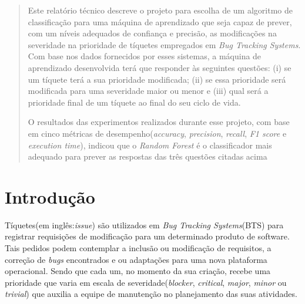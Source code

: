 \documentclass[11pt,twoside]{article}
\begin{document}
\begin{abstract} 

Este relatório técnico descreve o projeto para escolha de um algoritmo de classificação para uma máquina de aprendizado que seja capaz de prever, com um níveis adequados de confiança e precisão, as modificações na severidade na prioridade
de tíquetes empregados em \textit{Bug Tracking Systems}. Com base nos dados 
fornecidos por esses sistemas,  a máquina de 
aprendizado desenvolvida terá que responder às seguintes questões: (i) se um tíquete terá a sua prioridade modificada; (ii) se essa prioridade será modificada para uma 
severidade maior ou menor e (iii) qual será a prioridade final de um tíquete ao final do seu ciclo de vida.

O resultados das experimentos realizados durante esse projeto, com base em cinco métricas de desempenho(\textit{accuracy}, \textit{precision}, 
\textit{recall}, \textit{F1 score} e \textit{execution time}), indicou que o \textit{Random Forest} é o classificador mais adequado para prever as respostas das três questões citadas acima 




\end{abstract}

\section{Introdução}
	Tíquetes(em inglês:\textit{issue}) são utilizados em \textit{Bug Tracking Systems}(BTS) para registrar requisições de modificação para um 
	determinado produto de software. Tais pedidos podem contemplar a inclusão ou modificação de requisitos, a correção de \textit{bugs} encontrados 
	e ou adaptações para uma nova plataforma operacional\cite{SOM}. Sendo que cada um, no momento da sua criação, recebe uma prioridade que varia 
	em escala de severidade(\textit{blocker}, \textit{critical}, \textit{major}, \textit{minor} ou \textit{trivial}) que auxilia a equipe de manutenção 
	no planejamento das suas atividades.
	
\end{document}
